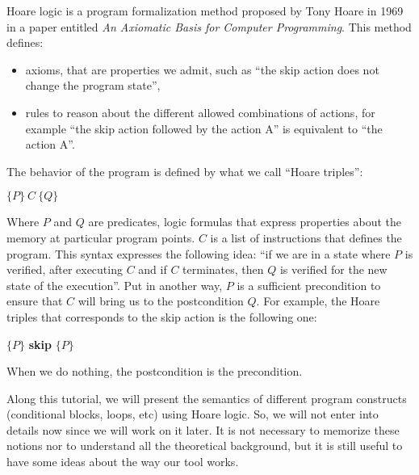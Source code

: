 




Hoare logic is a program formalization method proposed by Tony Hoare in
1969 in a paper entitled \emph{An Axiomatic Basis for Computer
Programming}. This method defines:



\begin{itemize}
\item   axioms, that are properties we admit, such as ``the skip action does
  not change the program state'',
\item   rules to reason about the different allowed combinations of actions,
  for example ``the skip action followed by the action A'' is equivalent
  to ``the action A''.
\end{itemize}


The behavior of the program is defined by what we call ``Hoare
triples'':




\begin{center}
$\{P\}\ C\ \{Q\}$
\end{center}


Where $P$ and $Q$ are predicates, logic formulas that express
properties about the memory at particular program points. $C$ is a
list of instructions that defines the program. This syntax expresses the
following idea: ``if we are in a state where $P$ is verified, after
executing $C$ and if $C$ terminates, then $Q$ is verified for the
new state of the execution''. Put in another way, $P$ is a sufficient
precondition to ensure that $C$ will bring us to the postcondition
$Q$. For example, the Hoare triples that corresponds to the skip
action is the following one:




\begin{center}
$\{P\}$ \textbf{skip} $\{P\}$
\end{center}


When we do nothing, the postcondition is the precondition.



Along this tutorial, we will present the semantics of different program
constructs (conditional blocks, loops, etc) using Hoare logic. So, we
will not enter into details now since we will work on it later. It is
not necessary to memorize these notions nor to understand all the
theoretical background, but it is still useful to have some ideas about
the way our tool works.



